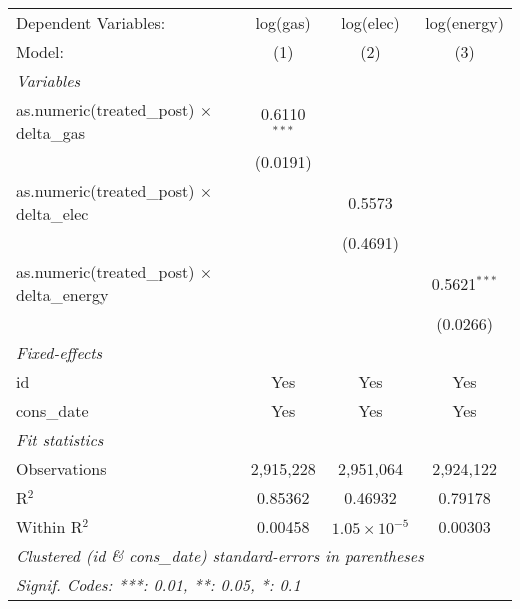 
\begin{tabular}{lccc}
   \tabularnewline\midrule\midrule
   Dependent Variables:                                & log(gas)       & log(elec)             & log(energy)\\
   Model:                                              & (1)            & (2)                   & (3)\\
   \midrule \emph{Variables} &   &   &  \\
   as.numeric(treated\_post) $\times$ delta\_gas    & 0.6110$^{***}$ &                       &   \\
                                                       & (0.0191)       &                       &   \\
   as.numeric(treated\_post) $\times$ delta\_elec   &                & 0.5573                &   \\
                                                       &                & (0.4691)              &   \\
   as.numeric(treated\_post) $\times$ delta\_energy &                &                       & 0.5621$^{***}$\\
                                                       &                &                       & (0.0266)\\
   \midrule \emph{Fixed-effects} &   &   &  \\
   id                                                  & Yes            & Yes                   & Yes\\
   cons\_date                                         & Yes            & Yes                   & Yes\\
   \midrule \emph{Fit statistics} &   &   &  \\
   Observations                                        & 2,915,228      & 2,951,064             & 2,924,122\\
   R$^2$                                               & 0.85362        & 0.46932               & 0.79178\\
   Within R$^2$                                        & 0.00458        & $1.05\times 10^{-5}$ & 0.00303\\
   \midrule\midrule\multicolumn{4}{l}{\emph{Clustered (id \& cons\_date) standard-errors in parentheses}}\\
   \multicolumn{4}{l}{\emph{Signif. Codes: ***: 0.01, **: 0.05, *: 0.1}}\\
\end{tabular}


